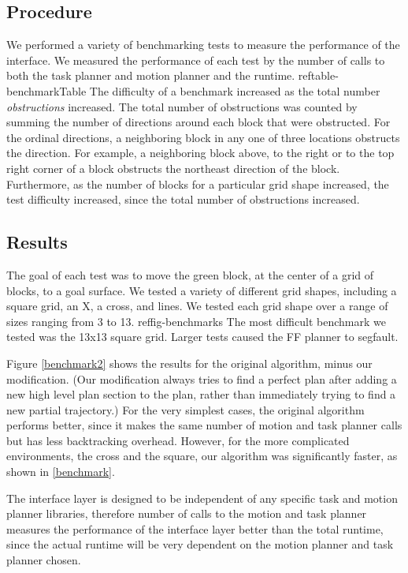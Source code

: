 \documentclass[12pt]{article}
\begin{document}
\subsection{Procedure}

We performed a variety of benchmarking tests to measure the performance of the interface. We measured the performance of each test by the number of calls to both the task planner and motion planner and the runtime. ref{table-benchmarkTable}
The difficulty of a benchmark increased as the total number \textit{obstructions} increased. The total number of obstructions was counted by summing the number of directions around each block that were obstructed. For the ordinal directions, a neighboring block in any one of three locations obstructs the direction. For example, a neighboring block above, to the right or to the top right corner of a block obstructs the northeast direction of the block. Furthermore, as the number of blocks for a particular grid shape increased, the test difficulty increased, since the total number of obstructions increased.

\subsection{Results}
The goal of each test was to move the green block, at the center of a grid of blocks, to a goal surface. 
We tested a variety of different grid shapes, including a square grid, an X, a cross, and lines. 
We tested each grid shape over a range of sizes ranging from 3 to 13. ref{fig-benchmarks} 
The most difficult benchmark we tested was the 13x13 square grid. Larger tests caused the FF planner to segfault.

Figure \ref{benchmark2} shows the results for the original algorithm, minus our modification.  (Our modification always tries to find a perfect plan after adding a new high level plan section to the plan, rather than immediately trying to find a new partial trajectory.)  For the very simplest cases, the original algorithm performs better, since it makes the same number of motion and task planner calls but has less backtracking overhead.  However, for the more complicated environments, the cross and the square, our algorithm was significantly faster, as shown in \ref{benchmark}.

The interface layer is designed to be independent of any specific task and motion planner libraries, therefore number of calls to the motion and task planner measures the performance of the interface layer better than the total runtime, since the actual runtime will be very dependent on the motion planner and task planner chosen.
\end{document}
